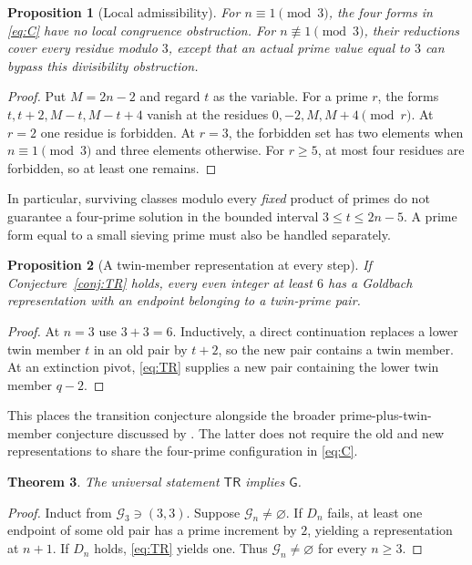 \documentclass[11pt,a4paper]{article}
\newtheorem{theorem}{Theorem}[section]
\newtheorem{proposition}[theorem]{Proposition}
\theoremstyle{definition}
\theoremstyle{remark}
\newcommand{\G}{\mathcal G}
\newcommand{\TR}{\mathsf{TR}}
\newcommand{\GB}{\mathsf G}
\begin{document}
\begin{proposition}[Local admissibility]\label{prop:localfour}
For $n\equiv1\pmod3$, the four forms in \eqref{eq:C} have no local
congruence obstruction. For $n\not\equiv1\pmod3$, their reductions
cover every residue modulo $3$, except that an actual prime value
equal to $3$ can bypass this divisibility obstruction.
\end{proposition}
\begin{proof}
Put $M=2n-2$ and regard $t$ as the variable. For a prime $r$, the
forms $t,t+2,M-t,M-t+4$ vanish at the residues
$0,-2,M,M+4\pmod r$. At $r=2$ one residue is forbidden.
At $r=3$, the forbidden set has two elements when $n\equiv1\pmod3$
and three elements otherwise. For $r\ge5$, at most four residues
are forbidden, so at least one remains.
\end{proof}
In particular, surviving classes modulo every \emph{fixed} product
of primes do not guarantee a four-prime solution in the bounded
interval $3\le t\le2n-5$. A prime form equal to a small sieving
prime must also be handled separately.

\begin{proposition}[A twin-member representation at every step]\label{prop:TRS}
If Conjecture~\ref{conj:TR} holds, every even integer at least $6$
has a Goldbach representation with an endpoint belonging to a
twin-prime pair.
\end{proposition}
\begin{proof}
At $n=3$ use $3+3=6$. Inductively, a direct continuation replaces
a lower twin member $t$ in an old pair by $t+2$, so the new pair
contains a twin member. At an extinction pivot, \eqref{eq:TR}
supplies a new pair containing the lower twin member $q-2$.
\end{proof}
This places the transition conjecture alongside the broader
prime-plus-twin-member conjecture discussed by \citet{Pandey2026}.
The latter does not require the old and new representations to
share the four-prime configuration in \eqref{eq:C}.

\begin{theorem}\label{thm:TRG}
The universal statement $\TR$ implies $\GB$.
\end{theorem}
\begin{proof}
Induct from $\G_3\ni(3,3)$. Suppose $\G_n\ne\varnothing$. If $D_n$ fails, at least one endpoint of some old pair has a prime increment by $2$, yielding a representation at $n+1$. If $D_n$ holds, \eqref{eq:TR} yields one. Thus $\G_n\ne\varnothing$ for every $n\ge3$.
\end{proof}
\end{document}
